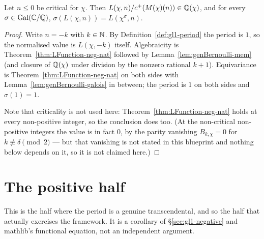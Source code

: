 \begin{theorem}
  \label{thm:gl1-nonpos}
  \leanok
  Let $n \leq 0$ be critical for $\chi$. Then $L(\chi,n)/c^{+}(M(\chi)(n)) \in \mathbb{Q}(\chi)$,
  and for every $\sigma \in \operatorname{Gal}(\mathbb{C}/\mathbb{Q})$,
  $\sigma(L(\chi,n)) = L(\chi^{\sigma},n)$.
\end{theorem}
\begin{proof}
  \leanok
  Write $n = -k$ with $k \in \mathbb{N}$. By Definition~\ref{def:gl1-period} the period is
  $1$, so the normalised value is $L(\chi,-k)$ itself. Algebraicity is
  Theorem~\ref{thm:LFunction-neg-nat} followed by
  Lemma~\ref{lem:genBernoulli-mem} (and closure of $\mathbb{Q}(\chi)$ under division by the
  nonzero rational $k+1$). Equivariance is Theorem~\ref{thm:LFunction-neg-nat} on both
  sides with Lemma~\ref{lem:genBernoulli-galois} in between; the period is $1$ on both
  sides and $\sigma(1) = 1$.

  Note that criticality is not used here: Theorem~\ref{thm:LFunction-neg-nat} holds at
  every non-positive integer, so the conclusion does too. (At the non-critical
  non-positive integers the value is in fact $0$, by the parity vanishing
  $B_{k,\chi} = 0$ for $k \not\equiv \delta \pmod 2$ --- but that vanishing is not
  stated in this blueprint and nothing below depends on it, so it is not claimed
  here.)
\end{proof}

\section{The positive half}
\label{sec:gl1-positive}

This is the half where the period is a genuine transcendental, and so the half that
actually exercises the framework. It is a corollary of \S\ref{sec:gl1-negative} and
mathlib's functional equation, not an independent argument.


